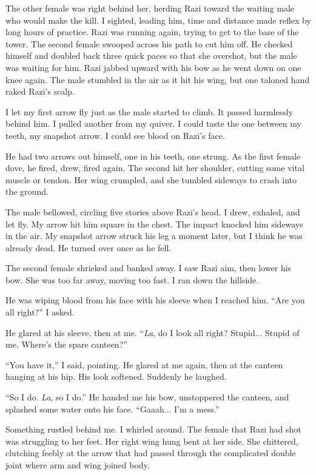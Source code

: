 The other female was right behind her, herding Razi toward the waiting
male who would make the kill.  I sighted, leading him, time and
distance made reflex by long hours of practice.  Razi was running
again, trying to get to the base of the tower.  The second female
swooped across his path to cut him off.  He checked himself and
doubled back three quick paces so that she overshot, but the male was
waiting for him.  Razi jabbed upward with his bow as he went down on
one knee again.  The male stumbled in the air as it hit his wing, but
one taloned hand raked Razi's scalp.

I let my first arrow fly just as the male started to climb.  It passed
harmlessly behind him.  I pulled another from my quiver.  I could
taste the one between my teeth, my snapshot arrow.  I could see blood
on Razi's face.

He had two arrows out himself, one in his teeth, one strung.  As the
first female dove, he fired, drew, fired again.  The second hit her
shoulder, cutting some vital muscle or tendon.  Her wing crumpled, and
she tumbled sideways to crash into the ground.

The male bellowed, circling five stories above Razi's head.  I drew,
exhaled, and let fly.  My arrow hit him square in the chest.  The
impact knocked him sideways in the air.  My snapshot arrow struck his
leg a moment later, but I think he was already dead.  He turned over
once as he fell.

The second female shrieked and banked away.  I saw Razi aim, then
lower his bow.  She was too far away, moving too fast.  I ran down the
hillside.

He was wiping blood from his face with his sleeve when I reached him.
``Are you all right?''  I asked.

He glared at his sleeve, then at me.  ``\emph{La}, do I look all right?
Stupid...  Stupid of me.  Where's the spare canteen?''

``You have it,'' I said, pointing.  He glared at me again, then at the
canteen hanging at his hip.  His look softened.  Suddenly he laughed.

``So I do.  \emph{La}, so I do.''  He handed me his bow, unstoppered the
canteen, and splashed some water onto his face.  ``Gaaah... I'm a
mess.''

Something rustled behind me.  I whirled around.  The female that Razi
had shot was struggling to her feet.  Her right wing hung bent at her
side.  She chittered, clutching feebly at the arrow that had passed
through the complicated double joint where arm and wing joined body.

